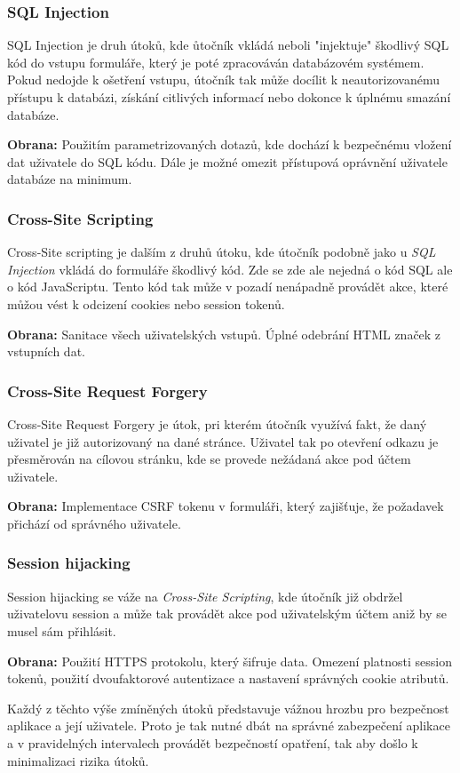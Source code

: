 \subsubsection*{SQL Injection}
\label{subsubsec:security-attacks-sql-injection}
SQL Injection je druh útoků, kde ůtočník vkládá neboli "injektuje" škodlivý SQL kód do vstupu formuláře, který je poté zpracováván databázovém systémem. Pokud nedojde k ošetření vstupu, útočník tak může docílit k neautorizovanému přístupu k databázi, získání citlivých informací nebo dokonce k úplnému smazání databáze.

\textbf{Obrana:} Použitím parametrizovaných dotazů, kde dochází k bezpečnému vložení dat uživatele do SQL kódu. Dále je možné omezit přístupová oprávnění uživatele databáze na minimum.

\subsubsection*{Cross-Site Scripting}
\label{subsubsec:security-attacks-cross-site-scripting}
Cross-Site scripting je dalším z druhů útoku, kde útočník podobně jako u \textit{SQL Injection} vkládá do formuláře škodlivý kód. Zde se zde ale nejedná o kód SQL ale o kód JavaScriptu. Tento kód tak může v pozadí nenápadně provádět akce, které můžou vést k odcizení cookies nebo session tokenů.

\textbf{Obrana:} Sanitace všech uživatelských vstupů. Úplné odebrání HTML značek z vstupních dat.

\subsubsection*{Cross-Site Request Forgery}
\label{subsubsec:security-attacks-cross-site-request-forgery}
Cross-Site Request Forgery je útok, pri kterém útočník využívá fakt, že daný uživatel je již autorizovaný na dané stránce. Uživatel tak po otevření odkazu je přesměrován na cílovou stránku, kde se provede nežádaná akce pod účtem uživatele.

\textbf{Obrana:} Implementace CSRF tokenu v formuláři, který zajišťuje, že požadavek přichází od správného uživatele.

\subsubsection*{Session hijacking}
\label{subsubsec:security-attacks-session-hijacking}
Session hijacking se váže na \textit{Cross-Site Scripting}, kde útočník již obdržel uživatelovu session a může tak provádět akce pod uživatelským účtem aniž by se musel sám přihlásit.

\textbf{Obrana:} Použití HTTPS protokolu, který šifruje data. Omezení platnosti session tokenů, použití dvoufaktorové autentizace a nastavení správných cookie atributů.
\newline

Každý z těchto výše zmíněných útoků představuje vážnou hrozbu pro bezpečnost aplikace a její uživatele. Proto je tak nutné dbát na správné zabezpečení aplikace a v pravidelných intervalech provádět bezpečností opatření, tak aby došlo k minimalizaci rizika útoků.


